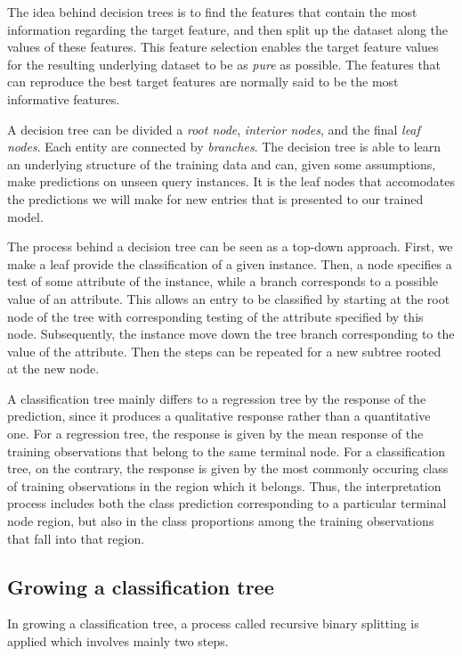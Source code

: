 The idea behind decision trees is to find the features that contain the most information regarding the target feature, and then split up the dataset along the values of these features. This feature selection enables the target feature values for the resulting underlying dataset to be as \textit{pure} as possible. The features that can reproduce the best target features are normally said to be the most informative features.

A decision tree can be divided a \textit{root node}, \textit{interior nodes}, and the final \textit{leaf nodes}. Each entity are connected by \textit{branches}. The decision tree is able to learn an underlying structure of the training data and can, given some assumptions, make predictions on unseen query instances. It is the leaf nodes that accomodates the predictions we will make for new entries that is presented to our trained model.

The process behind a decision tree can be seen as a top-down approach. First, we make a leaf provide the classification of a given instance. Then, a node specifies a test of some attribute of the instance, while a branch corresponds to a possible value of an attribute. This allows an entry to be classified by starting at the root node of the tree with corresponding testing of the attribute specified by this node. Subsequently, the instance move down the tree branch corresponding to the value of the attribute. Then the steps can be repeated for a new subtree rooted at the new node.

A classification tree mainly differs to a regression tree by the response of the prediction, since it produces a qualitative response rather than a quantitative one. For a regression tree, the response is given by the mean response of the training observations that belong to the same terminal node. For a classification tree, on the contrary, the response is given by the most commonly occuring class of training observations in the region which it belongs. Thus, the interpretation process includes both the class prediction corresponding to a particular terminal node region, but also in the class proportions among the training observations that fall into that region.

\subsection{Growing a classification tree}

In growing a classification tree, a process called recursive binary splitting is applied which involves mainly two steps.

